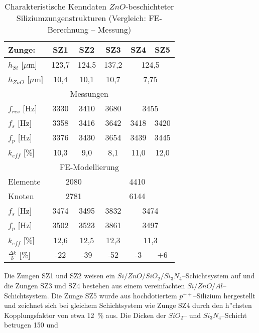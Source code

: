 \begin{table}[htb]
\caption{\label{tabzungen}
 Charakteristische Kenndaten $ZnO$-beschichteter Siliziumzungenstrukturen
 (Vergleich: FE-Berechnung -- Messung)}
\begin{center}
\begin{tabular}{|l||c|c|c|c|c|}
\hline
Zunge:              &  SZ1   &  SZ2   &  SZ3   &  SZ4 &  SZ5 \\
\hline \hline
 $h_{Si}$  [$\mu$m] & 123,7  & 124,5  &  137,2
 & \multicolumn{2}{|c|}{124,5} \\
 $h_{ZnO}$ [$\mu$m] & 10,4   & 10,1   &  10,7
 & \multicolumn{2}{|c|}{7,75} \\
\hline
 \multicolumn{6}{|c|}{Messungen} \\
\hline
 $f_{res}$ [Hz]  & 3330   & 3410   &  3680 & \multicolumn{2}{c|}{3455} \\
\hline
 $f_{s}$ [Hz]    & 3358   & 3416   &  3642   & 3418  & 3420  \\
 $f_{p}$ [Hz]    & 3376   & 3430   &  3654   & 3439  & 3445  \\
 $k_{eff}$ [\%]  & 10,3   & 9,0    &  8,1    & 11,0  & 12,0  \\
\hline
 \multicolumn{6}{|c|}{FE-Modellierung} \\
\hline
 Elemente  & \multicolumn{2}{|c|}{2080} & \multicolumn{3}{c|}{4410} \\
 Knoten    & \multicolumn{2}{|c|}{2781} & \multicolumn{3}{c|}{6144} \\
\hline
 $f_{s}$ [Hz]   & 3474   & 3495   &  3832   & \multicolumn{2}{c|}{3474} \\
 $f_{p}$ [Hz]   & 3502   & 3523   &  3861   & \multicolumn{2}{c|}{3497} \\
 $k_{eff}$ [\%] & 12,6   & 12,5   &  12,3   & \multicolumn{2}{c|}{11,3} \\
\hline
 $\frac{\Delta k}{k}$ [\%] & -22  & -39   &  -52    &   -3  & +6    \\
\hline
\end{tabular}
\end{center}
\end{table}
Die Zungen SZ1 und SZ2 weisen ein
$Si/ZnO/SiO_{2}/Si_{3}N_{4}$--Schichtsystem auf und
die Zungen SZ3 und SZ4 bestehen aus einem vereinfachten
$Si/ZnO/Al$--Schichtsystem. Die Zunge SZ5 wurde aus hochdotiertem
$p^{++}$--Silizium hergestellt und zeichnet sich bei gleichem Schichtsystem
wie Zunge SZ4 durch den h”chsten Kopplungsfaktor von etwa 12~\% aus.
Die Dicken der $SiO_{2}$-- und $Si_{3}N_{4}$--Schicht betrugen 150 und
